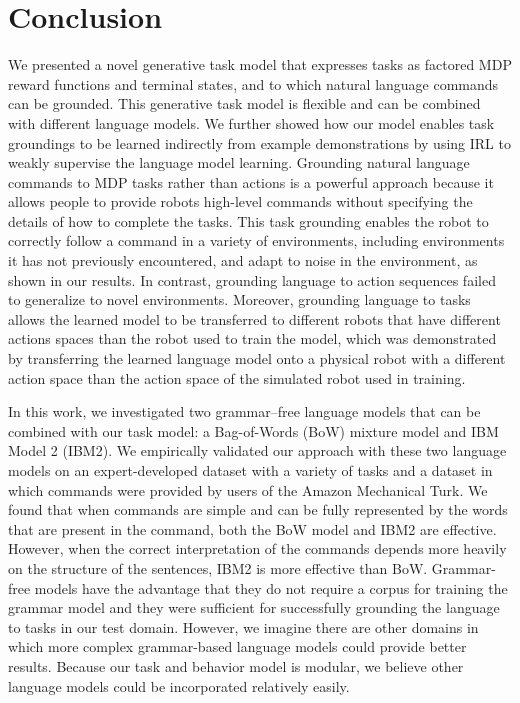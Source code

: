 \documentclass[conference]{IEEEtran}
\begin{document}
\section{Conclusion}
We presented a novel generative task model that expresses tasks as factored MDP reward functions and terminal states, and to which natural language commands can be grounded. This generative task model is flexible and can be combined with different language models. We further showed how our model enables task groundings to be learned indirectly from example demonstrations by using IRL to weakly supervise the language model learning. Grounding natural language commands to MDP tasks rather than actions is a powerful approach because it allows people to provide robots high-level commands without specifying the details of how to complete the tasks. This task grounding enables the robot to correctly follow a command in a variety of environments, including environments it has not previously encountered, and adapt to noise in the environment, as shown in our results. In contrast, grounding language to action sequences failed to generalize to novel environments. Moreover, grounding language to tasks allows the learned model to be transferred to different robots that have different actions spaces than the robot used to train the model, which was demonstrated by transferring the learned language model onto a physical robot with a different action space than the action space of the simulated robot used in training.

In this work, we investigated two grammar--free language models that can be combined with our task model: a Bag-of-Words (BoW) mixture model and IBM Model 2 (IBM2). %
We empirically validated our approach with these two language models on an expert-developed dataset with a variety of tasks and a dataset in which commands were provided by users of the Amazon Mechanical Turk. We found that when commands are simple and can be fully represented by the words that are present in the command, both the BoW model and IBM2 are effective. However, when the correct interpretation of the commands depends more heavily on the structure of the sentences, IBM2 is more effective than BoW. Grammar-free models have the advantage that they do not require a corpus for training the grammar model and they were sufficient for successfully grounding the language to tasks in our test domain. However, we imagine there are other domains in which more complex grammar-based language models could provide better results. Because our task and behavior model is modular, we believe other language models could be incorporated relatively easily.
\end{document}
